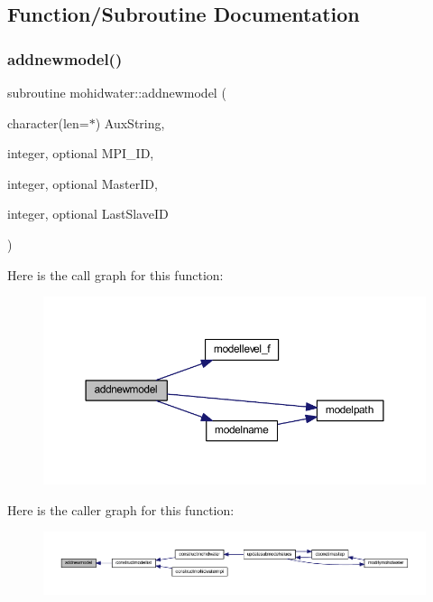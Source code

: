 \subsection{Function/\+Subroutine Documentation}
\mbox{\label{_main_8_f90_a2f77a4f5e6866a09c535fb9958312f17}} 
\subsubsection{\texorpdfstring{addnewmodel()}{addnewmodel()}}
{\footnotesize\ttfamily subroutine mohidwater\+::addnewmodel (\begin{DoxyParamCaption}\item[{character(len=$\ast$)}]{Aux\+String,  }\item[{integer, optional}]{M\+P\+I\+\_\+\+ID,  }\item[{integer, optional}]{Master\+ID,  }\item[{integer, optional}]{Last\+Slave\+ID }\end{DoxyParamCaption})}

Here is the call graph for this function\+:\nopagebreak
\begin{figure}[H]
\begin{center}
\leavevmode
\includegraphics[width=350pt]{_main_8_f90_a2f77a4f5e6866a09c535fb9958312f17_cgraph}
\end{center}
\end{figure}
Here is the caller graph for this function\+:\nopagebreak
\begin{figure}[H]
\begin{center}
\leavevmode
\includegraphics[width=350pt]{_main_8_f90_a2f77a4f5e6866a09c535fb9958312f17_icgraph}
\end{center}
\end{figure}
\mbox{\label{_main_8_f90_a02fa61b3a3e945d0354664955c2666fb}} 
